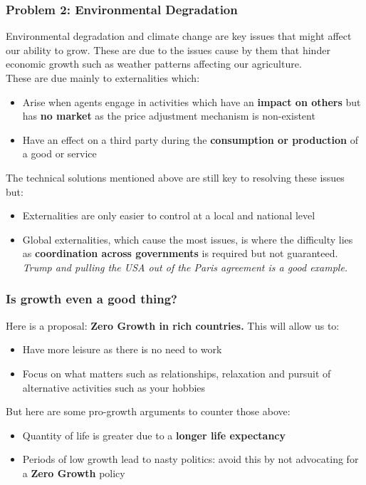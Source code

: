 \documentclass[12pt, letterpaper]{article}
\begin{document}
\subsubsection{Problem 2: Environmental Degradation}
Environmental degradation and climate change are key issues that might affect our ability to grow. These are due to the issues cause by them that hinder economic growth such as weather patterns affecting our agriculture. \\
These are due mainly to externalities which:
\begin{itemize}
	\item Arise when agents engage in activities which have an \textbf{impact on others} but has \textbf{no market} as the price adjustment mechanism is non-existent
	\item Have an effect on a third party during the \textbf{consumption or production} of a good or service
\end{itemize}
The technical solutions mentioned above are still key to resolving these issues but:
\begin{itemize}
	\item Externalities are only easier to control at a local and national level
	\item Global externalities, which cause the most issues, is where the difficulty lies as \textbf{coordination across governments} is required but not guaranteed. \textit{Trump and pulling the USA out of the Paris agreement is a good example.}
\end{itemize}

\subsubsection{Is growth even a good thing?}
Here is a proposal: \textbf{Zero Growth in rich countries.} This will allow us to:
\begin{itemize}
	\item Have more leisure as there is no need to work
	\item Focus on what matters such as relationships, relaxation and pursuit of alternative activities such as your hobbies
\end{itemize}

But here are some pro-growth arguments to counter those above:
\begin{itemize}
	\item Quantity of life is greater due to a \textbf{longer life expectancy}
	\item Periods of low growth lead to nasty politics: avoid this by not advocating for a \textbf{Zero Growth} policy
\end{itemize}
\end{document}

